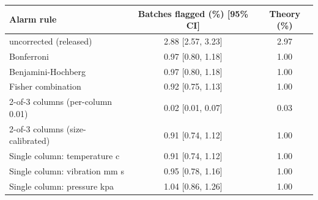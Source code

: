 \begin{tabular}{lcc}
\toprule
\textbf{Alarm rule} & \textbf{Batches flagged (\%) [95\% CI]} & \textbf{Theory (\%)} \\
\midrule
uncorrected (released) & 2.88 [2.57, 3.23] & 2.97 \\
Bonferroni & 0.97 [0.80, 1.18] & 1.00 \\
Benjamini-Hochberg & 0.97 [0.80, 1.18] & 1.00 \\
Fisher combination & 0.92 [0.75, 1.13] & 1.00 \\
2-of-3 columns (per-column 0.01) & 0.02 [0.01, 0.07] & 0.03 \\
2-of-3 columns (size-calibrated) & 0.91 [0.74, 1.12] & 1.00 \\
\midrule
Single column: temperature c & 0.91 [0.74, 1.12] & 1.00 \\
Single column: vibration mm s & 0.95 [0.78, 1.16] & 1.00 \\
Single column: pressure kpa & 1.04 [0.86, 1.26] & 1.00 \\
\bottomrule
\end{tabular}
